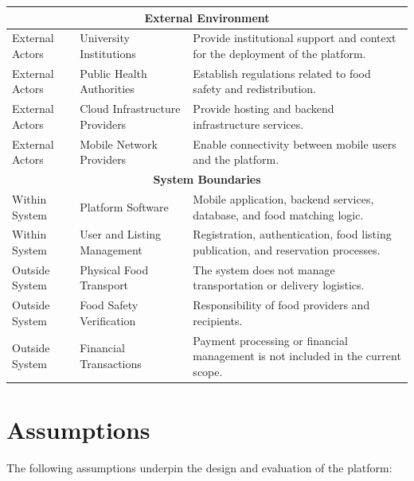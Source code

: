 \documentclass[conference]{IEEEtran}
\begin{document}
\begin{table}[h]
\begin{tabular}{|p{3cm}|p{4cm}|p{8cm}|}
\hline
\multicolumn{3}{|c|}{\textbf{External Environment}} \\
\hline
External Actors & University Institutions & Provide institutional support and context for the deployment of the platform. \\
\hline
External Actors & Public Health Authorities & Establish regulations related to food safety and redistribution. \\
\hline
External Actors & Cloud Infrastructure Providers & Provide hosting and backend infrastructure services. \\
\hline
External Actors & Mobile Network Providers & Enable connectivity between mobile users and the platform. \\
\hline
\multicolumn{3}{|c|}{\textbf{System Boundaries}} \\
\hline
Within System & Platform Software & Mobile application, backend services, database, and food matching logic. \\
\hline
Within System & User and Listing Management & Registration, authentication, food listing publication, and reservation processes. \\
\hline
Outside System & Physical Food Transport & The system does not manage transportation or delivery logistics. \\
\hline
Outside System & Food Safety Verification & Responsibility of food providers and recipients. \\
\hline
Outside System & Financial Transactions & Payment processing or financial management is not included in the current scope. \\
\hline
\end{tabular}
\end{table}

\section{Assumptions}

The following assumptions underpin the design and evaluation of the platform:
\end{document}
